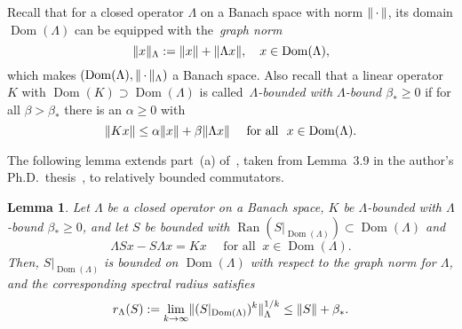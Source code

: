 \documentclass[11pt,a4paper]{amsart}
\numberwithin{equation}{section}
\DeclareMathOperator{\Ran}{Ran}
\DeclareMathOperator{\Dom}{Dom}
\DeclarePairedDelimiter{\norm}{\lVert}{\rVert}
\theoremstyle{plain}
\newtheorem{lemma}[theorem]{Lemma}
\theoremstyle{definition}
\theoremstyle{remark}
\begin{document}
Recall that for a closed operator $\Lambda$ on a Banach space with norm $\norm{\,\cdot\,}$, its domain $\Dom(\Lambda)$ can be
equipped with the~\emph{graph norm}
\begin{equation*}
 \norm{x}_\Lambda := \norm{x} + \norm{\Lambda x},\quad x\in\Dom(\Lambda),
\end{equation*}
which makes $(\Dom(\Lambda),\norm{\,\cdot\,}_\Lambda)$ a Banach space. Also recall that a linear operator $K$ with
$\Dom(K) \supset \Dom(\Lambda)$ is called~\emph{$\Lambda$-bounded with $\Lambda$-bound $\beta_* \ge 0$} if for all
$\beta > \beta_*$ there is an $\alpha \ge 0$ with
\begin{equation}\label{eq:relBound}
  \norm{Kx}
  \le
  \alpha \norm{x} + \beta \norm{\Lambda x}
  \quad\text{ for all }\
  x \in \Dom(\Lambda)
  .
\end{equation}

The following lemma extends part~(a) of~\cite[Proposition~A.5]{NSTTV18}, taken from Lemma~3.9 in the author's
Ph.D.~thesis~\cite{SeelDiss}, to relatively bounded commutators.

\begin{lemma}\label{lem:specRad}
  Let $\Lambda$ be a closed operator on a Banach space, $K$ be $\Lambda$-bounded with $\Lambda$-bound $\beta_* \ge 0$, and let
  $S$ be bounded with $\Ran(S|_{\Dom(\Lambda)})\subset\Dom(\Lambda)$ and
  \begin{equation*}
    \Lambda Sx - S\Lambda x
    =
    Kx
    \quad\text{ for all }\
    x\in\Dom(\Lambda)
    .
  \end{equation*}
  Then, $S|_{\Dom(\Lambda)}$ is bounded on $\Dom(\Lambda)$ with respect to the graph norm for $\Lambda$, and the corresponding
  spectral radius satisfies
  \begin{equation*}
    r_\Lambda(S)
    :=
    \lim_{k\to\infty} \norm{(S|_{\Dom(\Lambda)})^k}_\Lambda^{1/k}\le\norm{S} + \beta_*
    .
  \end{equation*}
\end{lemma}
\end{document}
